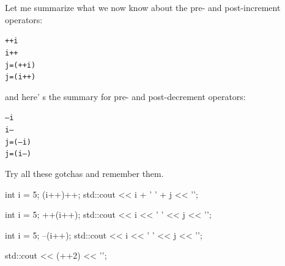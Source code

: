 Let me summarize what we now know about the pre- and post-increment
operators:
\begin{flushleft}
\texttt{++i}\\
\texttt{i++}\\
\texttt{j=(++i)}\\
\texttt{j=(i++)}\\
\end{flushleft}
and here' s the summary for pre- and post-decrement
operators:
\begin{flushleft}
\texttt{--i}\\
\texttt{i--}\\
\texttt{j=(--i)}\\
\texttt{j=(i--)}\\
\end{flushleft}
\newpage{}

Try all these gotchas and remember them.
\begin{console}
int i = 5;
(i++)++;
std::cout << i + ' ' + j << '\n';
\end{console}
\begin{console}
int i = 5;
++(i++);
std::cout << i << ' ' << j << '\n';
\end{console}
\begin{console}
int i = 5;
--(i++);
std::cout << i << ' ' << j << '\n';
\end{console}
\begin{console}
std::cout << (++2) << '\n';
\end{console}
\newpage{}



